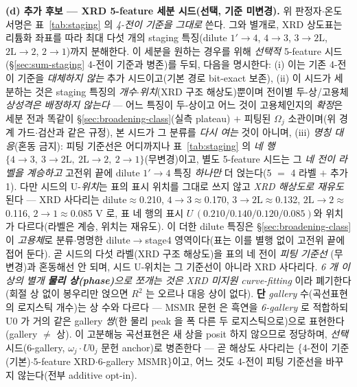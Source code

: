 \textbf{(d) 추가 후보 --- XRD 5-feature 세분 시드(선택, 기준 미변경).} 위 판정자$\cdot$온도 서명은
표~\ref{tab:staging} 의 \emph{4-전이 기준을 그대로} 쓴다. 그와 별개로, XRD 상도표는 리튬화 좌표를 따라 최대
다섯 개의 staging 특징(dilute $1'\!\to\!4$, $4\!\to\!3$, $3\!\to\!2\mathrm L$, $2\mathrm L\!\to\!2$, $2\!\to\!1$)까지
분해한다\cite{dahn1991}. 이 세분을 원하는 경우를 위해 \emph{선택적} 5-feature 시드
(\S\ref{sec:sum-staging} 4-전이 기준과 병존)를 두되, 다음을 명시한다:
(i) 이는 기존 4-전이 기준을 \emph{대체하지 않는} 추가 시드이고(기본 경로 bit-exact 보존),
(ii) 이 시드가 세분하는 것은 staging 특징의 \emph{개수$\cdot$위치}(XRD 구조 해상도)뿐이며 전이별
두-상/고용체 \emph{상성격은 배정하지 않는다} --- 어느 특징이 두-상이고 어느 것이 고용체인지의 \emph{확정}은
세분 전과 똑같이 \S\ref{sec:broadening-class}(실측 plateau) $+$ 피팅된 $\Omega_j$ 소관이며(위 경계 가드$\cdot$검산과
같은 규정), 본 시드가 그 분류를 \emph{다시 여는} 것이 아니며,
(iii) \emph{명칭 대응}(혼동 금지): 피팅 기준선은 어디까지나 표~\ref{tab:staging} 의 \emph{네 행}
$\{4\!\to\!3,\ 3\!\to\!2\mathrm L,\ 2\mathrm L\!\to\!2,\ 2\!\to\!1\}$(무변경)이고, 별도
5-feature 시드는 그 \emph{네 전이 라벨을 계승하고} 고전위 끝에 dilute
$1'\!\to\!4$ 특징 \emph{하나만} 더 얹는다(5 $=$ 4 라벨 $+$ 추가 1). 다만 시드의 U-\emph{위치}는 표의 표시 위치를
그대로 쓰지 않고 \emph{XRD 해상도로 재유도}된다 --- XRD 사다리는 dilute$\approx$0.210, $4\!\to\!3\approx$0.170,
$3\!\to\!2\mathrm L\approx$0.132, $2\mathrm L\!\to\!2\approx$0.116, $2\!\to\!1\approx$0.085 V 로, 표 네 행의 표시
$U\,(0.210/0.140/0.120/0.085)$와 위치가 다르다(라벨은 계승, 위치는 재유도). 이 더한 dilute 특징은
\S\ref{sec:broadening-class} 이 \emph{고용체}로 분류$\cdot$명명한 dilute$\to$stage4 영역이다(표는 이를 별행 없이
고전위 끝에 접어 둔다). 곧 시드의 다섯 라벨(XRD 구조 해상도)을 표의 네 전이 \emph{피팅 기준선}
(무변경)과 혼동해선 안 되며, 시드 U-위치는 그 기준선이 아니라 XRD 사다리다.
\emph{6 개 이상의 별개 \textbf{물리 상(phase)}으로 쪼개는 것은 XRD 미지원 curve-fitting} 이라 폐기한다(회절 상 없이
봉우리만 얹으면 $R^2$ 는 오르나 대응 상이 없다). \textbf{단} \emph{gallery} 수(곡선표현의 로지스틱 개수)는 상 수와
다르다 --- MSMR 문헌\cite{verbrugge2017} 은 흑연을 \emph{6-gallery} 로 적합하되 U0 가 거의 같은 gallery
\emph{쌍}(한 물리 peak 을 폭 다른 두 로지스틱으로)으로 표현한다(gallery $\ne$ 상). 이 고분해능 곡선표현은 새 상을
posit 하지 않으므로 정당하며, \emph{선택} 시드(6-gallery, $\omega_j\cdot U0_j$
문헌 anchor)로 병존한다 --- 곧 해상도 사다리는 \{4-전이 기준(기본)$\cdot$5-feature XRD$\cdot$6-gallery MSMR\}이고,
어느 것도 4-전이 피팅 기준선을 바꾸지 않는다(전부 additive opt-in).

